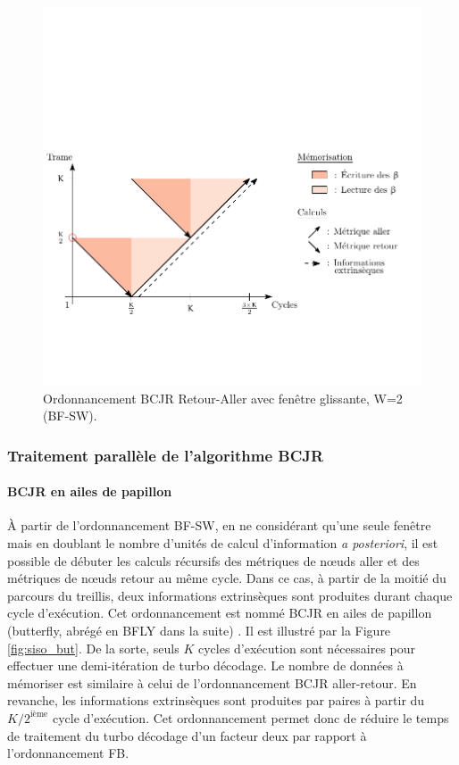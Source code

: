 \begin{figure}[!hb]
	\centering
	\includegraphics{main/ch4_fig/ipe/BF_SW+LEG.pdf}
	\caption{Ordonnancement BCJR Retour-Aller avec fenêtre glissante, W=2 (BF-SW). \label{fig:siso_sw}}
\end{figure}

\subsubsection{Traitement parallèle de l'algorithme BCJR}
\paragraph*{BCJR en ailes de papillon}
À partir de l'ordonnancement BF-SW, en ne considérant qu'une seule fenêtre mais en doublant le nombre d'unités de 
calcul d'information \textit{a posteriori}, il est possible de débuter les calculs récursifs des métriques de nœuds 
aller et des métriques de nœuds retour au même cycle. Dans ce cas, à partir de la moitié du parcours du treillis, deux 
informations extrinsèques sont produites durant chaque cycle d'exécution. Cet ordonnancement est nommé BCJR en ailes de papillon (butterfly, 
abrégé en BFLY dans la suite) \cite{butterfly}. Il est illustré par la Figure \ref{fig:siso_but}. De la sorte, seuls 
$K$ cycles d'exécution sont nécessaires pour effectuer une demi-itération de turbo décodage. Le nombre de données à mémoriser
est similaire à celui de l'ordonnancement BCJR aller-retour. En revanche, les informations extrinsèques sont produites par paires à 
partir du $K/2^{\text{ième}}$ cycle d’exécution. Cet ordonnancement permet donc de réduire le temps de traitement du turbo décodage d'un 
facteur deux par rapport à l'ordonnancement FB.

